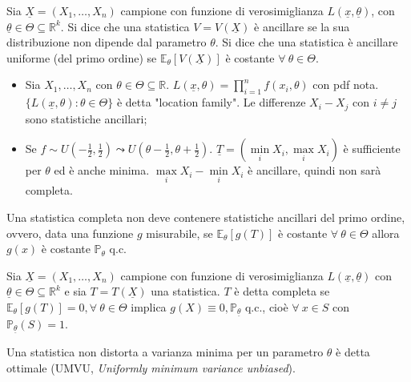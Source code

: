 \documentclass[hidelinks, 10pt]{report}
\begin{document}
\begin{defn}
Sia $ \underline{X} = (X_1, \dotsc, X_n) $ campione con funzione di verosimiglianza $ L(\underline{x}, \underline{\theta}) $, con $ \underline{\theta} \in \Theta \subseteq \mathbb{R}^k $. Si dice che una statistica $ V = V(\underline{X}) $ \`e ancillare se la sua distribuzione non dipende dal parametro $ \theta $. Si dice che una statistica \`e ancillare uniforme (del primo ordine) se $ \mathbb{E}_{\theta} [V(\underline{X})] $ \`e costante $ \forall\ \theta \in \Theta $.
\end{defn}

\begin{es}
\noindent
\begin{itemize}
\item Sia $ X_1, \dotsc, X_n $ con $ \theta \in \Theta \subseteq \mathbb{R} $. $ L(\underline{x}, \theta) = \prod\limits_{i = 1}^{n} f(x_i, \theta) $ con pdf nota. $ \{ L(\underline{x}, \theta) : \theta \in \Theta \} $ \`e detta "location family". Le differenze $ X_i - X_j $ con $ i \ne j $ sono statistiche ancillari;
\item Se $ f \sim U \left( -\frac{1}{2}, \frac{1}{2} \right) \leadsto U \left( \theta - \frac{1}{2}, \theta + \frac{1}{2} \right) $. $ \underline{T} = (\min\limits_{i} X_i, \max\limits_{i} X_i ) $ \`e sufficiente per $ \theta $ ed \`e anche minima. $ \max\limits_{i} X_i - \min\limits_{i} X_i $ \`e ancillare, quindi non sar\`a completa.
\end{itemize}
\end{es}

Una statistica completa non deve contenere statistiche ancillari del primo ordine, ovvero, data una funzione $ g $ misurabile, se $ \mathbb{E}_{\theta} [g(T)] $ \`e costante $ \forall\ \theta \in \Theta $ allora $ g(x) $ \`e costante $ \mathbb{P}_{\theta} $ q.c.

\begin{defn}
Sia $ \underline{X} = (X_1, \dotsc, X_n) $ campione con funzione di verosimiglianza $ L(\underline{x}, \underline{\theta}) $ con $ \underline{\theta} \in \Theta \subseteq \mathbb{R}^k $ e sia $ T = T(\underline{X}) $ una statistica. $ T $ \`e detta completa se $ \mathbb{E}_{\theta}[g(T)] = 0, \forall\ \theta \in \Theta $ implica $ g(X) \equiv 0, \mathbb{P}_{\underline{\theta}} $ q.c., cio\`e $ \forall\ x \in S $ con $ \mathbb{P}_{\underline{\theta}} (S) = 1 $.
\end{defn}

\begin{defn}
Una statistica non distorta a varianza minima per un parametro $ \theta $ \`e detta ottimale (UMVU, \emph{Uniformly minimum variance unbiased}).
\end{defn}
\end{document}
